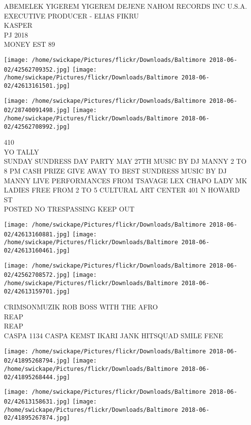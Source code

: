 \documentclass[10pt,letterpaper]{article}
\begin{document}
ABEMELEK YIGEREM YIGEREM DEJENE NAHOM RECORDS INC U.S.A. EXECUTIVE PRODUCER {-} ELIAS FIKRU\\
KASPER\\
PJ 2018\\
MONEY EST 89\\
\pagebreak

\texttt{[image: /home/swickape/Pictures/flickr/Downloads/Baltimore 2018-06-02/42562709352.jpg]}
\texttt{[image: /home/swickape/Pictures/flickr/Downloads/Baltimore 2018-06-02/42613161501.jpg]}

\texttt{[image: /home/swickape/Pictures/flickr/Downloads/Baltimore 2018-06-02/28740091498.jpg]}
\texttt{[image: /home/swickape/Pictures/flickr/Downloads/Baltimore 2018-06-02/42562708992.jpg]}

410\\
YO TALLY\\
SUNDAY SUNDRESS DAY PARTY MAY 27TH MUSIC BY DJ MANNY 2 TO 8 PM CASH PRIZE GIVE AWAY TO BEST SUNDRESS MUSIC BY DJ MANNY LIVE PERFORMANCES FROM TSAVAGE LEX CHAPO LADY MK LADIES FREE FROM 2 TO 5 CULTURAL ART CENTER 401 N HOWARD ST\\
POSTED NO TRESPASSING KEEP OUT\\
\pagebreak

\texttt{[image: /home/swickape/Pictures/flickr/Downloads/Baltimore 2018-06-02/42613160881.jpg]}
\texttt{[image: /home/swickape/Pictures/flickr/Downloads/Baltimore 2018-06-02/42613160461.jpg]}

\texttt{[image: /home/swickape/Pictures/flickr/Downloads/Baltimore 2018-06-02/42562708572.jpg]}
\texttt{[image: /home/swickape/Pictures/flickr/Downloads/Baltimore 2018-06-02/42613159701.jpg]}

CRIMSONMUZIK ROB BOSS WITH THE AFRO\\
REAP\\
REAP\\
CASPA 1134 CASPA KEMST IKARI JANK HITSQUAD SMILE FENE\\
\pagebreak

\texttt{[image: /home/swickape/Pictures/flickr/Downloads/Baltimore 2018-06-02/41895268794.jpg]}
\texttt{[image: /home/swickape/Pictures/flickr/Downloads/Baltimore 2018-06-02/41895268444.jpg]}

\texttt{[image: /home/swickape/Pictures/flickr/Downloads/Baltimore 2018-06-02/42613158631.jpg]}
\texttt{[image: /home/swickape/Pictures/flickr/Downloads/Baltimore 2018-06-02/41895267874.jpg]}
\end{document}
